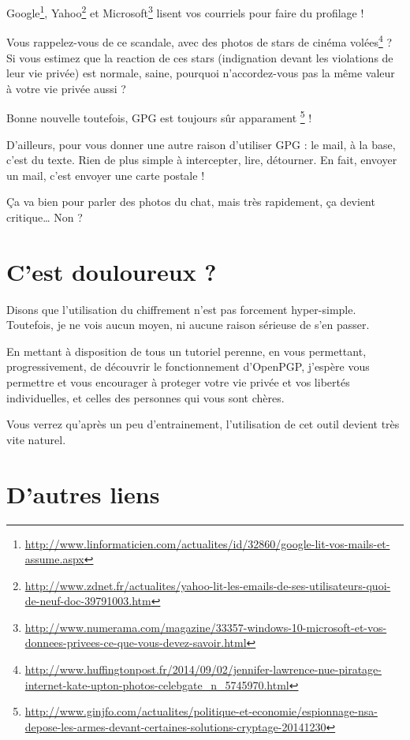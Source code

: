 Google\footnote{\url{http://www.linformaticien.com/actualites/id/32860/google-lit-vos-mails-et-assume.aspx}},
Yahoo\footnote{\url{http://www.zdnet.fr/actualites/yahoo-lit-les-emails-de-ses-utilisateurs-quoi-de-neuf-doc-39791003.htm}}
et Microsoft\footnote{\url{http://www.numerama.com/magazine/33357-windows-10-microsoft-et-vos-donnees-privees-ce-que-vous-devez-savoir.html}} lisent vos courriels pour faire du profilage !

Vous rappelez-vous de ce scandale, avec des photos de stars de cinéma volées\footnote{\url{http://www.huffingtonpost.fr/2014/09/02/jennifer-lawrence-nue-piratage-internet-kate-upton-photos-celebgate_n_5745970.html}} ?\\Si vous estimez que la reaction de ces stars (indignation devant les violations de leur vie privée) est
normale, saine, pourquoi n'accordez-vous pas la même valeur à votre vie privée aussi ?

Bonne nouvelle toutefois, GPG est toujours sûr apparament
\footnote{\url{http://www.ginjfo.com/actualites/politique-et-economie/espionnage-nsa-depose-les-armes-devant-certaines-solutions-cryptage-20141230}} !

D'ailleurs, pour vous donner une autre raison d'utiliser GPG : le mail, à la base, c'est du texte. Rien de plus simple à intercepter, lire,
détourner. En fait, envoyer un mail, c'est envoyer une carte postale !

Ça va bien pour parler des photos du chat, mais très rapidement, ça
devient critique\ldots{} Non ?

\section{C'est douloureux ?}\label{cest-douloureux}

Disons que l'utilisation du chiffrement n'est pas forcement hyper-simple. Toutefois, je ne vois aucun moyen, ni
aucune raison sérieuse de s'en passer.

En mettant à disposition de tous un tutoriel perenne, en vous
permettant, progressivement, de découvrir le fonctionnement d'OpenPGP,
j'espère vous permettre et vous encourager à proteger votre vie privée
et vos libertés individuelles, et celles des personnes qui vous sont
chères.

Vous verrez qu'après un peu d'entrainement, l'utilisation de cet outil
devient très vite naturel.

\section{D'autres liens}\label{dautres-liens}

